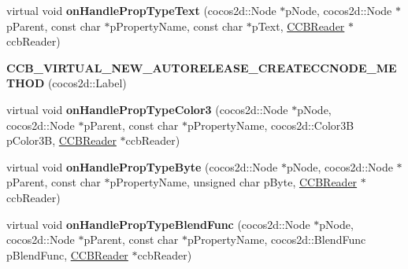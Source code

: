 \begin{DoxyCompactItemize}
\item 
\mbox{\label{classcocosbuilder_1_1LabelBMFontLoader_a6689471b70a68a407c8829f94d0790d8}} 
virtual void {\bfseries on\+Handle\+Prop\+Type\+Text} (cocos2d\+::\+Node $\ast$p\+Node, cocos2d\+::\+Node $\ast$p\+Parent, const char $\ast$p\+Property\+Name, const char $\ast$p\+Text, \hyperlink{classcocosbuilder_1_1CCBReader}{C\+C\+B\+Reader} $\ast$ccb\+Reader)
\item 
\mbox{\label{classcocosbuilder_1_1LabelBMFontLoader_aacf124f45f6bd22cec1066fb355ebc8c}} 
{\bfseries C\+C\+B\+\_\+\+V\+I\+R\+T\+U\+A\+L\+\_\+\+N\+E\+W\+\_\+\+A\+U\+T\+O\+R\+E\+L\+E\+A\+S\+E\+\_\+\+C\+R\+E\+A\+T\+E\+C\+C\+N\+O\+D\+E\+\_\+\+M\+E\+T\+H\+OD} (cocos2d\+::\+Label)
\item 
\mbox{\label{classcocosbuilder_1_1LabelBMFontLoader_a2f2af6a97f778a2231867c8f3b84f852}} 
virtual void {\bfseries on\+Handle\+Prop\+Type\+Color3} (cocos2d\+::\+Node $\ast$p\+Node, cocos2d\+::\+Node $\ast$p\+Parent, const char $\ast$p\+Property\+Name, cocos2d\+::\+Color3B p\+Color3B, \hyperlink{classcocosbuilder_1_1CCBReader}{C\+C\+B\+Reader} $\ast$ccb\+Reader)
\item 
\mbox{\label{classcocosbuilder_1_1LabelBMFontLoader_aeeef42dc39674b9a766f61731e393aeb}} 
virtual void {\bfseries on\+Handle\+Prop\+Type\+Byte} (cocos2d\+::\+Node $\ast$p\+Node, cocos2d\+::\+Node $\ast$p\+Parent, const char $\ast$p\+Property\+Name, unsigned char p\+Byte, \hyperlink{classcocosbuilder_1_1CCBReader}{C\+C\+B\+Reader} $\ast$ccb\+Reader)
\item 
\mbox{\label{classcocosbuilder_1_1LabelBMFontLoader_ad0c8e679645c0d7743070cae38ffc569}} 
virtual void {\bfseries on\+Handle\+Prop\+Type\+Blend\+Func} (cocos2d\+::\+Node $\ast$p\+Node, cocos2d\+::\+Node $\ast$p\+Parent, const char $\ast$p\+Property\+Name, cocos2d\+::\+Blend\+Func p\+Blend\+Func, \hyperlink{classcocosbuilder_1_1CCBReader}{C\+C\+B\+Reader} $\ast$ccb\+Reader)
\item 
\mbox{\label{classcocosbuilder_1_1LabelBMFontLoader_a615851858a22dbdf17eed7337444d72c}} 

\end{DoxyCompactItemize}
